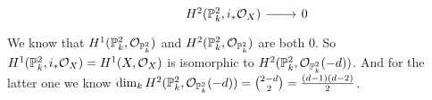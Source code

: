 \begin{exercise}{3}
\begin{enumerate}
{\begin{equation*}
\begin{tikzcd}
                    &H^2(\Proj^2_k, i_* \mathcal{O}_X) \arrow{r} & 0
                \end{tikzcd}
                \end{equation*}
                We know that $H^1(\mathbb{P}^2_k, \mathcal{O}_{\mathbb{P}^2_k})$ and
                $H^2(\mathbb{P}^2_k, \mathcal{O}_{\mathbb{P}^2_k})$ are both $0$.
                So $H^1(\mathbb{P}^2_k, i_* \mathcal{O}_X) = H^1(X, \mathcal{O}_X)$
                is isomorphic to $H^2(\mathbb{P}^2_k, \mathcal{O}_{\mathbb{P}^2_k}(-d))$.
                And for the latter one we know $\dim_k H^2(\mathbb{P}^2_k,
                \mathcal{O}_{\mathbb{P}^2_k}(-d)) = \binom{2 - d}{2} =
                \frac{(d-1)(d-2)}{2}$.

            }
    \end{enumerate}
\end{exercise}


